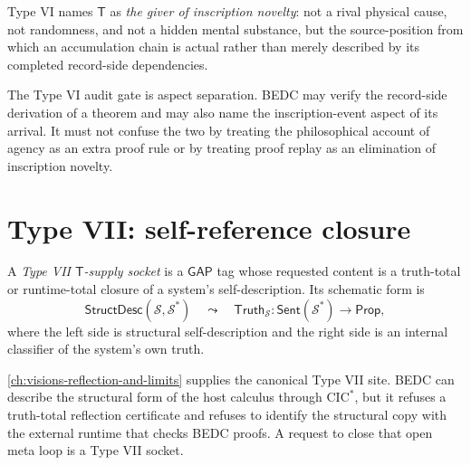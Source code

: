 \begin{definition}
\label{def:transcendental-supply-type-VI-reading}
Type VI names $\mathsf{T}$ as \emph{the giver of inscription novelty}: not a rival physical cause, not randomness, and not a hidden mental substance, but the source-position from which an accumulation chain is actual rather than merely described by its completed record-side dependencies.
\end{definition}

\begin{remark}
\label{rem:transcendental-supply-type-VI-gate}
The Type VI audit gate is aspect separation. BEDC may verify the record-side derivation of a theorem and may also name the inscription-event aspect of its arrival. It must not confuse the two by treating the philosophical account of agency as an extra proof rule or by treating proof replay as an elimination of inscription novelty.
\end{remark}


\section{Type VII: self-reference closure}
\label{sec:transcendental-supply-type-VII}

\begin{definition}
\label{def:transcendental-supply-type-VII}
A \emph{Type VII $\mathsf{T}$-supply socket} is a $\mathsf{GAP}$ tag whose requested content is a truth-total or runtime-total closure of a system's self-description. Its schematic form is
$$
\mathsf{StructDesc}(\mathcal{S},\mathcal{S}^{*})
\quad\leadsto\quad
\mathsf{Truth}_{\mathcal{S}}:\mathsf{Sent}(\mathcal{S}^{*})\to\mathsf{Prop},
$$
where the left side is structural self-description and the right side is an internal classifier of the system's own truth.
\end{definition}

\begin{example}
\label{ex:transcendental-supply-type-VII-engineering}
\autoref{ch:visions-reflection-and-limits} supplies the canonical Type VII site. BEDC can describe the structural form of the host calculus through $\mathrm{CIC}^{*}$, but it refuses a truth-total reflection certificate and refuses to identify the structural copy with the external runtime that checks BEDC proofs. A request to close that open meta loop is a Type VII socket.
\end{example}

